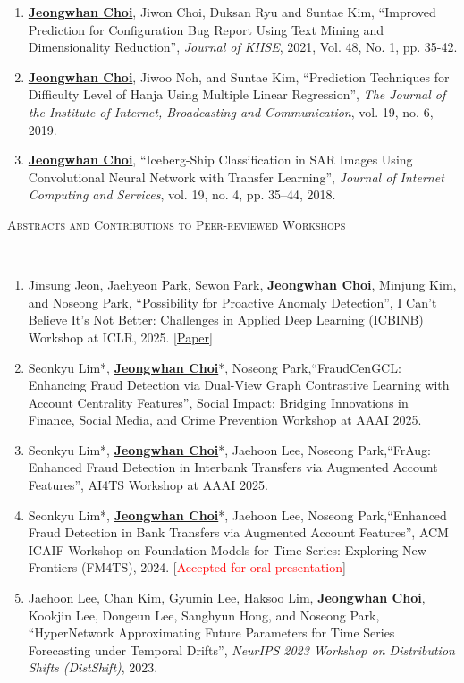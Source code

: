 \documentclass[10pt]{article}
\newenvironment{changemargin}[2]{
  \begin{list}{}{
    \setlength{\topsep}{0pt}
    \setlength{\leftmargin}{#1}
    \setlength{\rightmargin}{#2}
    \setlength{\listparindent}{\parindent}
    \setlength{\itemindent}{\parindent}
    \setlength{\parsep}{\parskip}
  }
  \item[]}{\end{list}
}
\newcommand{\lineover}{
	\begin{changemargin}{-0.05in}{-0.05in}
		\vspace*{-8pt}
		\hrulefill \\
		\vspace*{-2pt}
	\end{changemargin}
}
\newcommand{\RED}[1]{\textcolor{red}{#1}}
\newcommand{\textbu}[1]{\underline{\textbf{#1}}}
\newenvironment{body} {
	\vspace*{-16pt}
	\begin{changemargin}{-0.25in}{-0.5in}
  }
	{\end{changemargin}
}
\begin{document}
\begin{body}
\begin{enumerate}
    \item \textbu{Jeongwhan Choi}, Jiwon Choi, Duksan Ryu and Suntae Kim, ``Improved Prediction for Configuration Bug Report Using Text Mining and Dimensionality Reduction'', \emph{Journal of KIISE}, 2021, Vol. 48, No. 1, pp. 35-42.
    \item \textbu{Jeongwhan Choi}, Jiwoo Noh, and Suntae Kim, ``Prediction Techniques for Difficulty Level of Hanja Using Multiple Linear Regression'', \emph{The Journal of the Institute of Internet, Broadcasting and Communication}, vol. 19, no. 6, 2019.
    \item \textbu{Jeongwhan Choi}, ``Iceberg-Ship Classification in SAR Images Using Convolutional Neural Network with Transfer Learning'', \emph{Journal of Internet Computing and Services}, vol. 19, no. 4, pp. 35–44, 2018.
\end{enumerate}

\vspace{1em}
\textsc{Abstracts and Contributions to Peer-reviewed Workshops}
\lineover
\begin{enumerate}
    \item Jinsung Jeon, Jaehyeon Park, Sewon Park, \textbf{Jeongwhan Choi}, Minjung Kim, and Noseong Park, ``Possibility for Proactive Anomaly Detection'', I Can't Believe It's Not Better: Challenges in Applied Deep Learning (ICBINB) Workshop at ICLR, 2025. [\href{https://openreview.net/forum?id=w63aCqNRFp}{Paper}]
    \item Seonkyu Lim*, \textbu{Jeongwhan Choi}*, Noseong Park,``FraudCenGCL: Enhancing Fraud Detection via Dual-View Graph Contrastive Learning with Account Centrality Features'', Social Impact: Bridging Innovations in Finance, Social Media, and Crime Prevention Workshop at AAAI 2025.
    \item Seonkyu Lim*, \textbu{Jeongwhan Choi}*, Jaehoon Lee, Noseong Park,``FrAug: Enhanced Fraud Detection in Interbank Transfers via Augmented Account Features'', AI4TS Workshop at AAAI 2025.
    \item Seonkyu Lim*, \textbu{Jeongwhan Choi}*, Jaehoon Lee, Noseong Park,``Enhanced Fraud Detection in Bank Transfers via Augmented Account Features'', ACM ICAIF Workshop on Foundation Models for Time Series: Exploring New Frontiers (FM4TS), 2024. [\RED{Accepted for oral presentation}]
    \item Jaehoon Lee, Chan Kim, Gyumin Lee, Haksoo Lim, \textbf{Jeongwhan Choi}, Kookjin Lee, Dongeun Lee, Sanghyun Hong, and Noseong Park, ``HyperNetwork Approximating Future Parameters for Time Series Forecasting under Temporal Drifts'', \emph{NeurIPS 2023 Workshop on Distribution Shifts (DistShift)}, 2023.
\end{enumerate}


\end{body}
\end{document}
